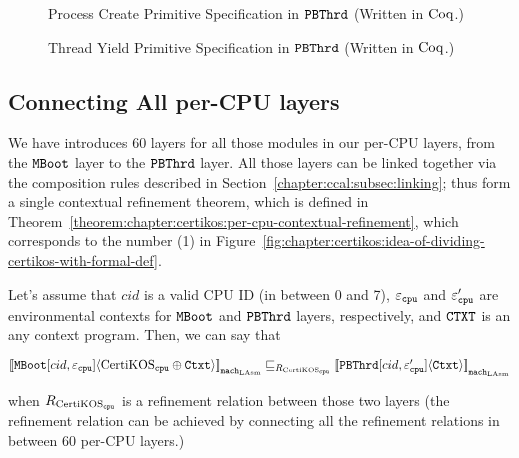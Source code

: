 \begin{figure}
 
\caption{Process Create Primitive Specification in ${\mathrm{\texttt{PBThrd}}}$ (Written in $\mathrm{Coq}$.)}
\label{fig:chapter:certikos:proc-create-cpu-spec}
\end{figure}


\begin{figure}
 
\caption{Thread Yield Primitive Specification in ${\mathrm{\texttt{PBThrd}}}$ (Written in $\mathrm{Coq}$.)}
\label{fig:chapter:certikos:thread-yield-cpu-spec} 
\end{figure}


\subsection{Connecting All per-CPU layers}
\label{chapter:certikos:subsec:connecting-all-per-cpu-layers}

We have introduces 60 layers for all those modules in our per-CPU layers, from the ${\mathrm{\texttt{MBoot}}}$ layer to the 
${\mathrm{\texttt{PBThrd}}}$ layer.
All those layers can be linked together via the composition rules described in Section~\ref{chapter:ccal:subsec:linking};
thus form a single contextual refinement theorem, which is defined in Theorem~\ref{theorem:chapter:certikos:per-cpu-contextual-refinement},
which corresponds to the number (1) in Figure~\ref{fig:chapter:certikos:idea-of-dividing-certikos-with-formal-def}.
\begin{theorem}
\label{theorem:chapter:certikos:per-cpu-contextual-refinement}
Let's assume that $cid$ is a valid CPU ID (in between 0 and 7), ${\varepsilon}_{{\mathrm{\texttt{cpu}}}}$ and  ${\varepsilon}'_{{\mathrm{\texttt{cpu}}}}$ are 
environmental contexts for ${\mathrm{\texttt{MBoot}}}$  and ${\mathrm{\texttt{PBThrd}}}$ layers, respectively, and ${\mathrm{\texttt{CTXT}}}$ is an any context program. Then, we can say that
\begin{center}
${[\![{{\mathrm{\texttt{MBoot}}}[cid, {\varepsilon}_{{\mathrm{\texttt{cpu}}}}]} \langle {\mathrm{CertiKOS}_{{\mathrm{\texttt{cpu}}}} \oplus {\mathrm{\texttt{Ctxt}}}} \rangle]\!]}_{{\mathrm{\texttt{mach}}}_{\mathrm{LAsm}}} \sqsubseteq_{R_{\mathrm{CertiKOS}_{\mathrm{\texttt{cpu}}}}} {[\![{{\mathrm{\texttt{PBThrd}}}[cid, {\varepsilon}'_{{\mathrm{\texttt{cpu}}}}]} \langle {{\mathrm{\texttt{Ctxt}}}} \rangle]\!]}_{{{\mathrm{\texttt{mach}}}_{\mathrm{LAsm}}}}$
\end{center}
when ${R_{\mathrm{CertiKOS}_{\mathrm{\texttt{cpu}}}}}$ is a refinement relation between those two layers (the refinement relation can be achieved by 
connecting all the refinement relations in between 60 per-CPU layers.)
\end{theorem}


